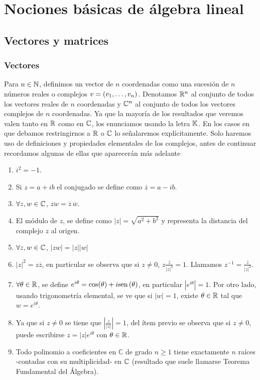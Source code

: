 \chapter{Nociones básicas de álgebra lineal}

\section{Vectores y matrices}

\subsection{Vectores}
Para $n \in \mathbb N$, definimos un vector de $n$ coordenadas como una sucesión de $n$ n\'umeros reales o complejos $\vb = (v_1, \dots, v_n)$.
Denotamos $\mathbb R^n$ al conjunto de todos los vectores reales de $n$ coordenadas y $\mathbb C^n$ al conjunto de todos los vectores complejos de $n$ coordenadas.
Ya que la mayoría de los resultados que veremos valen tanto en $\mathbb R$ como en $\mathbb C$, los enunciamos usando la letra $\mathbb K$. En los casos en que debamos restringirnos a $\mathbb R$ o $\mathbb C$ lo señalaremos explícitamente. Solo haremos uso de  definiciones y propiedades elementales de los complejos, antes de continuar recordamos algunas de ellas que aparecerán más adelante
\begin{enumerate}
\item $i^2=-1$.
 \item Si $z=a+ib$ el conjugado se define como $\overline{z}=a-ib$.
 \item $\forall z,w\in \mathbb C$,  $\overline{zw}=\overline{z}\,\overline{w}$.
 \item El módulo de $z$, se define como $|z|=\sqrt{a^2+b^2}$ y representa la distancia del complejo $z$ al origen.
 \item $\forall z,w\in \mathbb C$, $|zw|=|z||w|$
 \item $|z|^2=z\overline{z}$, en particular se observa que si $z\neq 0$, $z\frac{\overline{z}}{|z|^2}=1$. Llamamos $z^{-1}=\frac{\overline{z}}{|z|^2}$.
 \item $\forall \theta\in \mathbb R$, se define $e^{i\theta}=\cos(\theta)+i\mbox{sen\,}(\theta)$, en particular $|e^{i\theta}|=1$. Por otro lado, usando trigonometría elemental, se ve que si $|w|=1$, existe $\theta\in \mathbb R$ tal que $w=e^{i\theta}$.
 \item Ya que si $z\neq 0$ se tiene que $\left| \frac{z}{|z|}\right|=1$, del ítem previo se observa que si $z\neq 0$, puede escribirse $z=|z|e^{i\theta}$ con $\theta\in \mathbb R$.
 \item Todo polinomio a coeficientes en $\mathbb{C}$ de grado $n\ge 1$ tiene exactamente $n$ raíces -contadas con su multiplicidad- en $\mathbb C$ (resultado que suele llamarse Teorema Fundamental del Álgebra).
\end{enumerate}




